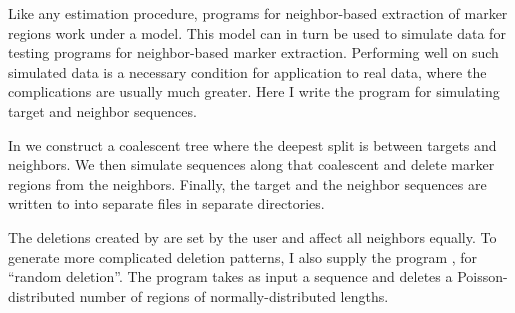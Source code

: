 Like any estimation procedure, programs for neighbor-based extraction
of marker regions work under a model. This model can in turn be used
to simulate data for testing programs for neighbor-based marker
extraction. Performing well on such simulated data is a necessary
condition for application to real data, where the complications are
usually much greater. Here I write the program  for
simulating target and neighbor sequences.

In  we construct a coalescent tree where the deepest split is
between targets and neighbors. We then simulate sequences along that
coalescent and delete marker regions from the neighbors. Finally, the
target and the neighbor sequences are written to into separate files
in separate directories.

The deletions created by  are set by the user and affect all
neighbors equally. To generate more complicated deletion patterns, I
also supply the program , for ``random deletion''. The program
 takes as input a sequence and deletes a Poisson-distributed
number of regions of normally-distributed lengths.
